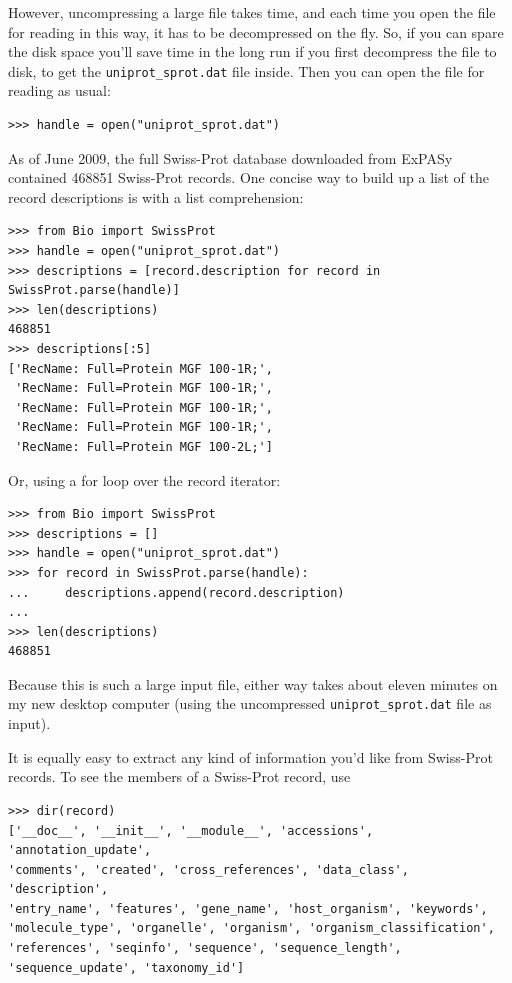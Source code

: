 \documentclass{report}
\begin{document}
However, uncompressing a large file takes time, and each time you open the file for reading in this way, it has to be decompressed on the fly.  So, if you can spare the disk space you'll save time in the long run if you first decompress the file to disk, to get the \verb|uniprot_sprot.dat| file inside.  Then you can open the file for reading as usual:

\begin{verbatim}
>>> handle = open("uniprot_sprot.dat")
\end{verbatim}

As of June 2009, the full Swiss-Prot database downloaded from ExPASy contained 468851 Swiss-Prot records.  One concise way to build up a list of the record descriptions is with a list comprehension: 
\begin{verbatim}
>>> from Bio import SwissProt
>>> handle = open("uniprot_sprot.dat")
>>> descriptions = [record.description for record in SwissProt.parse(handle)]
>>> len(descriptions)
468851
>>> descriptions[:5]
['RecName: Full=Protein MGF 100-1R;',
 'RecName: Full=Protein MGF 100-1R;',
 'RecName: Full=Protein MGF 100-1R;',
 'RecName: Full=Protein MGF 100-1R;',
 'RecName: Full=Protein MGF 100-2L;']

\end{verbatim}

Or, using a for loop over the record iterator:
\begin{verbatim}
>>> from Bio import SwissProt
>>> descriptions = []
>>> handle = open("uniprot_sprot.dat")
>>> for record in SwissProt.parse(handle):
...     descriptions.append(record.description)
...
>>> len(descriptions)
468851
\end{verbatim}

Because this is such a large input file, either way takes about eleven minutes on my new desktop computer (using the uncompressed \verb|uniprot_sprot.dat| file as input).

It is equally easy to extract any kind of information you'd like from Swiss-Prot records. To see the members of a Swiss-Prot record, use
\begin{verbatim}
>>> dir(record)
['__doc__', '__init__', '__module__', 'accessions', 'annotation_update',
'comments', 'created', 'cross_references', 'data_class', 'description',
'entry_name', 'features', 'gene_name', 'host_organism', 'keywords',
'molecule_type', 'organelle', 'organism', 'organism_classification',
'references', 'seqinfo', 'sequence', 'sequence_length',
'sequence_update', 'taxonomy_id']
\end{verbatim}
\end{document}
